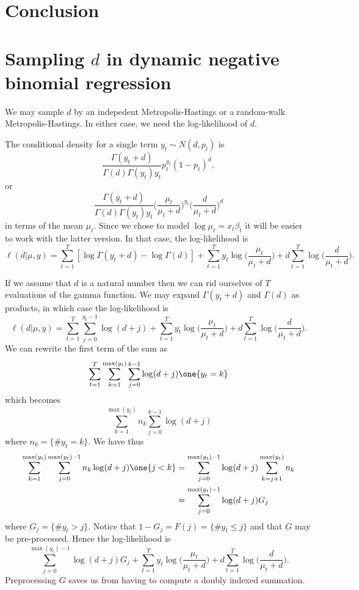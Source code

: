 \documentclass[11pt]{article}
\begin{document}
\section{Conclusion}

\appendix

\section{Sampling $d$ in dynamic negative binomial regression}
\label{sec:sample-d}

We may sample $d$ by an indepedent Metropolis-Hastings or a random-walk
Metropolis-Hastings.  In either case, we need the log-likelihood of $d$.

The conditional density for a single term $y_t \sim N(d, p_t)$ is
\[
\frac{\Gamma(y_t + d)}{\Gamma(d) \Gamma(y_t) y_t} p_t^{y_t} (1-p_t)^{d} ,
\]
or 
\[
\frac{\Gamma(y_t + d)}{\Gamma(d) \Gamma(y_t) y_t} 
\Big( \frac{\mu_t}{\mu_t + d} \Big)^{y_t} \Big( \frac{d}{\mu_t + d} \Big)^d
\]
in terms of the mean $\mu_t$.  Since we chose to model $\log \mu_t = x_t
\beta_t$ it will be easier to work with the latter version.  In that case, the
log-likelihood is
\[
\ell(d|\mu, y) = \sum_{t=1}^T [ \log \Gamma(y_t + d)  - \log \Gamma(d) ]  + 
\sum_{t=1}^T y_t \log \big( \frac{\mu_t}{\mu_t + d} \Big) +
d \sum_{t=1}^T \log \Big( \frac{d}{\mu_t + d} \Big).
\]

If we assume that $d$ is a natural number then we can rid ourselves of $T$
evaluations of the gamma function.  We may expand $\Gamma(y_t + d)$ and
$\Gamma(d)$ as products, in which case the log-likelihood is
\[
\ell(d|\mu, y) = \sum_{t=1}^T \sum_{j=0}^{y_t-1} \log(d + j) + 
\sum_{t=1}^T y_t \log \big( \frac{\mu_t}{\mu_t + d} \Big) +
d \sum_{t=1}^T \log \Big( \frac{d}{\mu_t + d} \Big).
\]
We can rewrite the first term of the sum as
\[
\sum_{t=1}^T \sum_{k=1}^{\max(y_t)} \sum_{j=0}^{k-1} \log(d+j) \one \{y_t = k\}
\]
which becomes
\[
\sum_{k=1}^{\max(y_t)} n_k \sum_{j=0}^{k-1} \log(d+j)
\]
where $n_k = \{ \# y_t = k \}$.  We have thus
\begin{align*}
\sum_{k=1}^{\max(y_t)} \sum_{j=0}^{\max(y_t)-1} n_k \log(d+j) \one\{j < k\}
& = 
\sum_{j=0}^{\max(y_t)-1} \log(d+j) \sum_{k=j+1}^{\max(y_t)} n_k \\
& = \sum_{j=0}^{\max(y_t)-1} \log(d+j) G_j
\end{align*}
where $G_j = \{ \# y_t > j \}$.  Notice that $1-G_j = F(j) = \{\# y_t \leq j\}$
and that $G$ may be pre-processed.  Hence the log-likelihood is
\[
\sum_{j=0}^{\max(y_t)-1} \log(d+j) G_j + 
\sum_{t=1}^T y_t \log \big( \frac{\mu_t}{\mu_t + d} \Big) +
d \sum_{t=1}^T \log \Big( \frac{d}{\mu_t + d} \Big).
\]
Preprocessing $G$ saves us from having to compute a doubly indexed summation.
\end{document}
